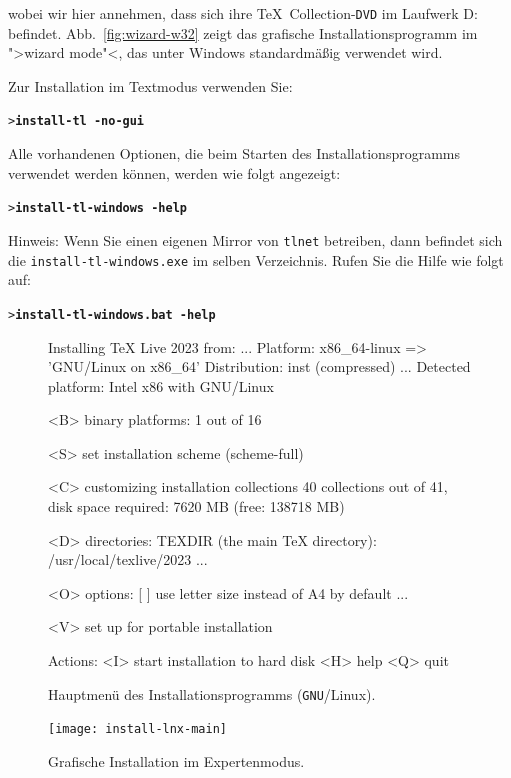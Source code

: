 \documentclass[12pt,ngerman,a4paper,fullparskip]{report}
\newcommand{\acro}[1]{\texttt{#1}}
\newcommand{\dirname}[1]{\texttt{#1}}
\newcommand{\Ucom}[1]{\textbf{\texttt{#1}}}
\def\TK{\TeX\ Collection}
\providecommand*{\DVD}{\acro{DVD}\xspace}
\providecommand*{\GNU}{\acro{GNU}\xspace}
\begin{document}
wobei wir hier annehmen, dass sich ihre \TK-\DVD im Laufwerk D: befindet.
Abb.~\ref{fig:wizard-w32} zeigt das grafische Installationsprogramm im
">wizard mode"<, das unter Windows standardmäßig verwendet wird.

Zur Installation im Textmodus verwenden Sie:
\begin{alltt}
> \Ucom{install-tl -no-gui}
\end{alltt}

\noindent Alle vorhandenen Optionen, die beim Starten des Installationsprogramms verwendet werden können, werden
wie folgt angezeigt:

\begin{alltt}
> \Ucom{install-tl-windows -help}
\end{alltt}

Hinweis: Wenn Sie einen eigenen Mirror von \dirname{tlnet} betreiben, dann befindet sich die \texttt{install-tl-windows.exe} im selben Verzeichnis. Rufen Sie die Hilfe wie folgt auf:

\begin{alltt}
> \Ucom{install-tl-windows.bat -help}
\end{alltt}


\begin{figure}[tb]
\begin{boxedverbatim}
Installing TeX Live 2023 from: ...
Platform: x86_64-linux => 'GNU/Linux on x86_64'
Distribution: inst (compressed)
...
 Detected platform: Intel x86 with GNU/Linux
 
 <B> binary platforms: 1 out of 16

 <S> set installation scheme (scheme-full)

 <C> customizing installation collections
     40 collections out of 41, disk space required: 7620 MB (free: 138718 MB)

 <D> directories:
   TEXDIR (the main TeX directory):
     /usr/local/texlive/2023
   ...

 <O> options:
   [ ] use letter size instead of A4 by default
   ...
 
 <V> set up for portable installation

Actions:
 <I> start installation to hard disk
 <H> help
 <Q> quit
\end{boxedverbatim}
\caption{Hauptmenü des Installationsprogramms (\GNU/Linux).}\label{fig:text-main}
\end{figure}

\begin{figure}[tb]
\texttt{[image: install-lnx-main]}
\caption{Grafische Installation im Expertenmodus.}\label{fig:gui-main}
\end{figure}
\end{document}
